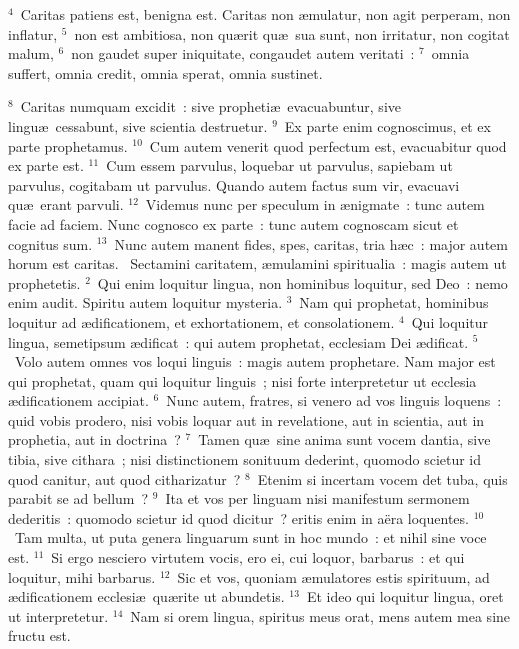 ${}^{4}$~Caritas patiens est, benigna est. Caritas non \ae mulatur, non agit perperam, non inflatur,
${}^{5}$~non est ambitiosa, non qu\ae rit qu\ae\ sua sunt, non irritatur, non cogitat malum,
${}^{6}$~non gaudet super iniquitate, congaudet autem veritati~:
${}^{7}$~omnia suffert, omnia credit, omnia sperat, omnia sustinet.


${}^{8}$~Caritas numquam excidit~: sive propheti\ae\ evacuabuntur, sive lingu\ae\ cessabunt, sive scientia destruetur.
${}^{9}$~Ex parte enim cognoscimus, et ex parte prophetamus.
${}^{10}$~Cum autem venerit quod perfectum est, evacuabitur quod ex parte est.
${}^{11}$~Cum essem parvulus, loquebar ut parvulus, sapiebam ut parvulus, cogitabam ut parvulus. Quando autem factus sum vir, evacuavi qu\ae\ erant parvuli.
${}^{12}$~Videmus nunc per speculum in \ae nigmate~: tunc autem facie ad faciem. Nunc cognosco ex parte~: tunc autem cognoscam sicut et cognitus sum.
${}^{13}$~Nunc autem manent fides, spes, caritas, tria h\ae c~: major autem horum est caritas.
~Sectamini caritatem, \ae mulamini spiritualia~: magis autem ut prophetetis.
${}^{2}$~Qui enim loquitur lingua, non hominibus loquitur, sed Deo~: nemo enim audit. Spiritu autem loquitur mysteria.
${}^{3}$~Nam qui prophetat, hominibus loquitur ad \ae dificationem, et exhortationem, et consolationem.
${}^{4}$~Qui loquitur lingua, semetipsum \ae dificat~: qui autem prophetat, ecclesiam Dei \ae dificat.
${}^{5}$~Volo autem omnes vos loqui linguis~: magis autem prophetare. Nam major est qui prophetat, quam qui loquitur linguis~; nisi forte interpretetur ut ecclesia \ae dificationem accipiat.
${}^{6}$~Nunc autem, fratres, si venero ad vos linguis loquens~: quid vobis prodero, nisi vobis loquar aut in revelatione, aut in scientia, aut in prophetia, aut in doctrina~?
${}^{7}$~Tamen qu\ae\ sine anima sunt vocem dantia, sive tibia, sive cithara~; nisi distinctionem sonituum dederint, quomodo scietur id quod canitur, aut quod citharizatur~?
${}^{8}$~Etenim si incertam vocem det tuba, quis parabit se ad bellum~?
${}^{9}$~Ita et vos per linguam nisi manifestum sermonem dederitis~: quomodo scietur id quod dicitur~? eritis enim in a\"era loquentes.
${}^{10}$~Tam multa, ut puta genera linguarum sunt in hoc mundo~: et nihil sine voce est.
${}^{11}$~Si ergo nesciero virtutem vocis, ero ei, cui loquor, barbarus~: et qui loquitur, mihi barbarus.
${}^{12}$~Sic et vos, quoniam \ae mulatores estis spirituum, ad \ae dificationem ecclesi\ae\ qu\ae rite ut abundetis.
${}^{13}$~Et ideo qui loquitur lingua, oret ut interpretetur.
${}^{14}$~Nam si orem lingua, spiritus meus orat, mens autem mea sine fructu est.
